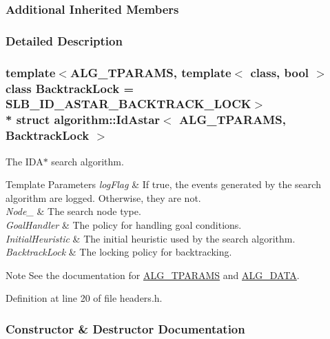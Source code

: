 \subsubsection*{Additional Inherited Members}


\subsubsection{Detailed Description}
\subsubsection*{template$<$A\+L\+G\+\_\+\+T\+P\+A\+R\+A\+MS, template$<$ class, bool $>$ class Backtrack\+Lock = S\+L\+B\+\_\+\+I\+D\+\_\+\+A\+S\+T\+A\+R\+\_\+\+B\+A\+C\+K\+T\+R\+A\+C\+K\+\_\+\+L\+O\+CK$>$\\*
struct algorithm\+::\+Id\+Astar$<$ A\+L\+G\+\_\+\+T\+P\+A\+R\+A\+M\+S, Backtrack\+Lock $>$}

The {\ttfamily I\+D\+A$\ast$} search algorithm. 


\begin{DoxyTemplParams}{Template Parameters}
{\em log\+Flag} & If {\ttfamily true}, the events generated by the search algorithm are logged. Otherwise, they are not. \\
\hline
{\em Node\+\_\+} & The search node type. \\
\hline
{\em Goal\+Handler} & The policy for handling goal conditions. \\
\hline
{\em Initial\+Heuristic} & The initial heuristic used by the search algorithm. \\
\hline
{\em Backtrack\+Lock} & The locking policy for backtracking. \\
\hline
\end{DoxyTemplParams}
\begin{DoxyNote}{Note}
See the documentation for \hyperlink{algorithm_8h_a521ad67aee0e10fb76ee132a9d5c0768}{A\+L\+G\+\_\+\+T\+P\+A\+R\+A\+MS} and \hyperlink{algorithm_8h_a64c012078deee9a30405e18ec11e6360}{A\+L\+G\+\_\+\+D\+A\+TA}. 
\end{DoxyNote}


Definition at line 20 of file headers.\+h.



\subsubsection{Constructor \& Destructor Documentation}
